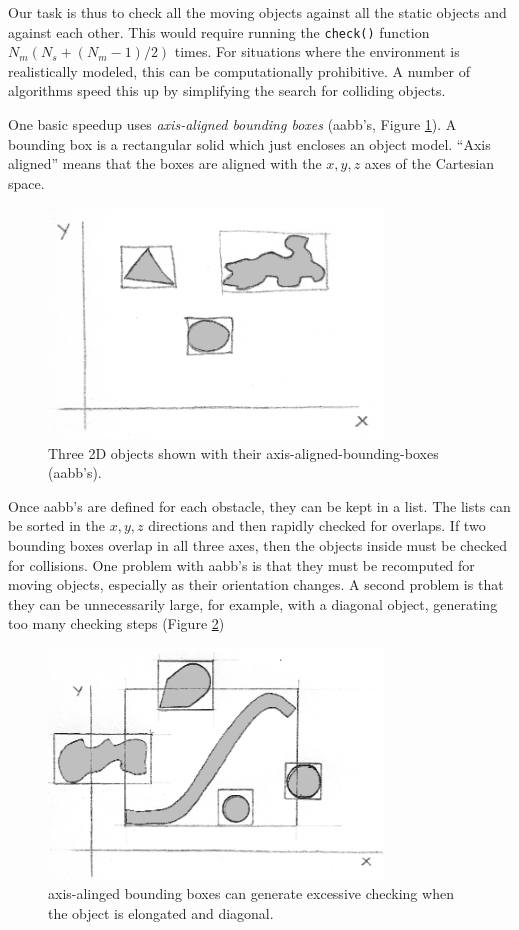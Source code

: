 Our task is thus to check all the moving objects against all the static objects and against each other.   This would require running the {\tt check()} function $N_m(N_s + (N_m-1)/2)$ times.   For situations where the environment is realistically modeled, this can be computationally prohibitive.   A number of algorithms speed this up by simplifying the search for colliding objects.

One basic speedup uses \textit{axis-aligned bounding boxes} (aabb's, Figure \ref{aabb}).  A bounding box is a rectangular solid  which just encloses an object model.  ``Axis aligned'' means that the boxes are aligned with the $x,y,z$ axes of the Cartesian space.  

\begin{figure}
\centering
\includegraphics[width=3.5in]{figs08/axisalgnbb.eps}
\caption{Three 2D objects shown with their axis-aligned-bounding-boxes (aabb's).}
\label{aabb}
\end{figure}


Once aabb's are defined for each obstacle, they can be kept in a list.   The lists can be sorted in the $x,y,z$ directions and then rapidly checked for overlaps.   If two bounding boxes overlap in all three axes, then the objects inside must be checked for collisions.    One problem with aabb's is that they must be recomputed for moving objects, especially as their orientation changes.   A second  problem is that they can be unnecessarily large, for example, with a diagonal object, generating too many checking steps (Figure \ref{aabbproblem})
 
\begin{figure}
\centering
\includegraphics[width=3.5in]{figs08/axisalgnbb2.eps}
\caption{axis-alinged bounding boxes can generate excessive checking when the object is elongated and diagonal. }
\label{aabbproblem}
\end{figure}


